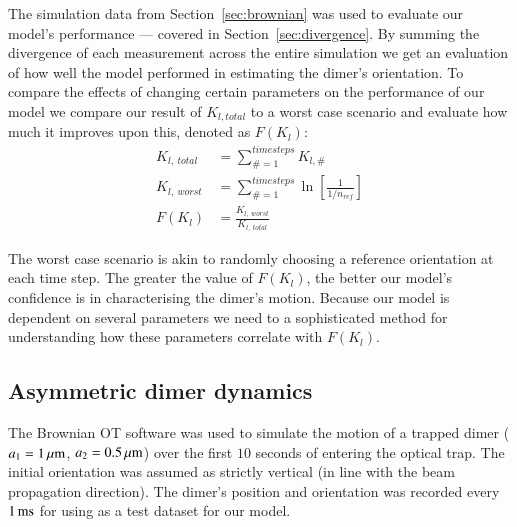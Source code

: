 \documentclass[final,  3p]{elsarticle}
\begin{document}
The simulation data from Section~\ref{sec:brownian} was used to evaluate our model's performance --- covered in Section~\ref{sec:divergence}. By summing the divergence of each measurement across the entire simulation we get an evaluation of how well the model performed in estimating the dimer's orientation. To compare the effects of changing certain parameters on the performance of our model we compare our result of $K_{l,total}$ to a worst case scenario and evaluate how much it improves upon this, denoted as $F(K_l)$:
\begin{align}
  K_{l, \ total} &= \sum\limits_{\# =1}^{timesteps} K_{l,\#}
  \\
  K_{l, \ worst} &= \sum\limits_{\#=1}^{timesteps} \ln \left[\frac{1}{1/n_{ref}} \right]
  \\
  F(K_l) &= \frac{K_{l,\ worst}}{K_{l, \ total}}
\end{align}

The worst case scenario is akin to randomly choosing a reference
orientation at each time step. The greater the value of $F(K_l)$, the
better our model's confidence is in characterising the dimer's
motion. Because our model is dependent on several parameters we need
to a sophisticated method for understanding how these parameters
correlate with $F(K_l)$.

\subsection{Asymmetric dimer dynamics}
\label{sec:motion}

The Brownian OT software was used to simulate the motion of a trapped dimer ($a_1=1\,\mu{\rm m}$, $a_2=0.5\,\mu{\rm m}$) over the first $10$ seconds of entering the optical trap.  The initial orientation was assumed as strictly vertical (in line with the beam propagation direction). The dimer's position and orientation was recorded every $1\,{\rm ms}$ for using as a test dataset for our model.
\end{document}
